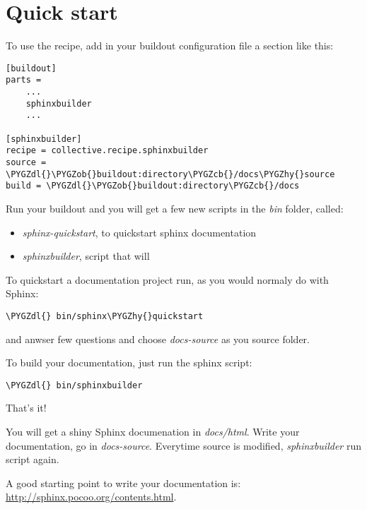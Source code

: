 \documentclass[letterpaper,10pt,english]{sphinxmanual}
\def\PYGZob{\char`\{}
\def\PYGZcb{\char`\}}
\def\PYGZdl{\char`\$}
\def\PYGZhy{\char`\-}
\begin{document}
\section{Quick start}
\label{quick_start:quick-start}\label{quick_start::doc}
To use the recipe, add in your buildout configuration file
a section like this:

\begin{Verbatim}[commandchars=\\\{\}]
[buildout]
parts =
    ...
    sphinxbuilder
    ...

[sphinxbuilder]
recipe = collective.recipe.sphinxbuilder
source = \PYGZdl{}\PYGZob{}buildout:directory\PYGZcb{}/docs\PYGZhy{}source
build = \PYGZdl{}\PYGZob{}buildout:directory\PYGZcb{}/docs
\end{Verbatim}

Run your buildout and you will get a few new scripts in the \emph{bin} folder,
called:
\begin{itemize}
\item {} 
\emph{sphinx-quickstart}, to quickstart sphinx documentation

\item {} 
\emph{sphinxbuilder}, script that will

\end{itemize}

To quickstart a documentation project run, as you would normaly do with Sphinx:

\begin{Verbatim}[commandchars=\\\{\}]
\PYGZdl{} bin/sphinx\PYGZhy{}quickstart
\end{Verbatim}

and anwser few questions and choose \emph{docs-source} as you source folder.

To build your documentation, just run the sphinx script:

\begin{Verbatim}[commandchars=\\\{\}]
\PYGZdl{} bin/sphinxbuilder
\end{Verbatim}

That's it!

You will get a shiny Sphinx documenation in \emph{docs/html}.
Write your documentation, go in \emph{docs-source}.
Everytime source is modified, \emph{sphinxbuilder} run script again.

A good starting point to write your documentation is:
\href{http://sphinx.pocoo.org/contents.html}{http://sphinx.pocoo.org/contents.html}.
\end{document}
